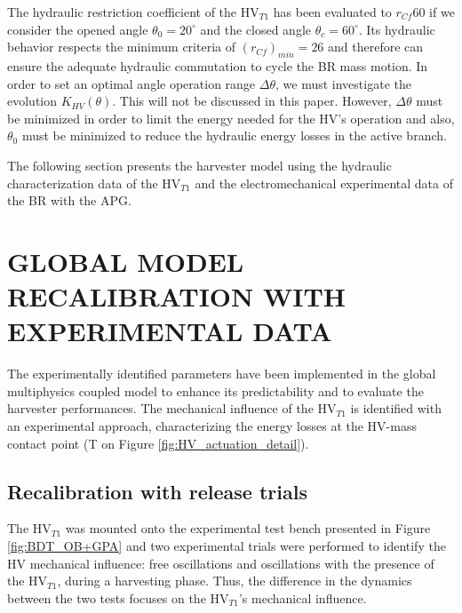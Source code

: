 \documentclass[3p,twocolumn,preprint]{elsarticle}
\begin{document}
The hydraulic restriction coefficient of the HV$_{T1}$ has been evaluated to $r_{Cf}60$ if we consider the opened angle $\theta_0=20^{\circ}$ and the closed angle $\theta_c = 60^{\circ}$. Its hydraulic behavior respects the minimum criteria of \mbox{$(r_{Cf})_{min}=26$} and therefore can ensure the adequate hydraulic commutation to cycle the BR mass motion. In order to set an optimal angle operation range $\Delta\theta$, we must investigate the evolution $K_{HV}(\theta)$. This will not be discussed in this paper. However, $\Delta\theta$ must be minimized in order to limit the energy needed for the HV's operation and also, $\theta_0$ must be minimized to reduce the hydraulic energy losses in the active branch.

The following section presents the harvester model using the hydraulic characterization data of the HV$_{T1}$ and the electromechanical experimental data of the BR with the APG.

\section{GLOBAL MODEL RECALIBRATION WITH \mbox{EXPERIMENTAL} DATA}
\label{sec:MODEL RECALIBRATION WITH EXPERIMENTAL DATA}
The experimentally identified parameters have been implemented in the global multiphysics coupled model to enhance its predictability and to evaluate the harvester performances. The mechanical influence of the HV$_{T1}$ is identified with an experimental approach, characterizing the energy losses at the HV-mass contact point (T on Figure \ref{fig:HV_actuation_detail}). 
	\subsection{Recalibration with release trials}
The HV$_{T1}$ was mounted onto the experimental test bench presented in Figure \ref{fig:BDT_OB+GPA} and two experimental trials were performed to identify the HV mechanical influence: free oscillations and oscillations with the presence of the HV$_{T1}$, during a harvesting phase. Thus, the difference in the dynamics between the two tests focuses on the HV$_{T1}$'s mechanical influence. 
\end{document}
